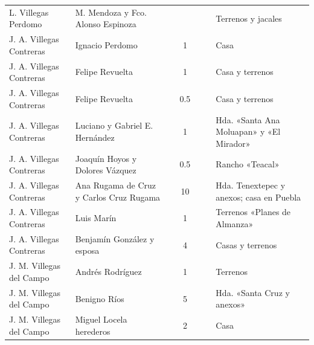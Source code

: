 \documentclass[14pt,twoside,final]{extbook} %
\begin{document}
{\begin{longtable}[c]{@{}p{2.5cm}lrSrrl@{}}
L. Villegas Perdomo & M. Mendoza y Fco. Alonso Espinoza &  & {} & {} & {} & Terrenos y jacales \\
J. A. Villegas Contreras & Ignacio Perdomo &  & 1 &  &  & Casa \\
J. A. Villegas Contreras & Felipe Revuelta &  & 1 &  &  & Casa y terrenos \\
J. A. Villegas Contreras & Felipe Revuelta &  & 0.5 &  &  & Casa y terrenos \\
J. A. Villegas Contreras & Luciano y Gabriel E. Hernández &  & 1 &  &  & Hda. «Santa Ana Moluapan» y «El Mirador» \\
J. A. Villegas Contreras & Joaquín Hoyos y Dolores Vázquez &  & 0.5 & {} & {} & Rancho «Teacal» \\
J. A. Villegas Contreras & Ana Rugama de Cruz y Carlos Cruz Rugama &  & 10 &  &  & Hda. Tenextepec y anexos; casa en Puebla \\
J. A. Villegas Contreras & Luis Marín &  & 1 &  &  & Terrenos «Planes de Almanza» \\
J. A. Villegas Contreras & Benjamín González y esposa &  & 4 &  &  & Casas y terrenos \\
J. M. Villegas del Campo & Andrés Rodríguez &  & 1 &  &  & Terrenos \\
J. M. Villegas del Campo & Benigno Ríos &  & 5 &  &  & Hda. «Santa Cruz y anexos» \\
J. M. Villegas del Campo & Miguel Locela herederos &  & 2 &  &  & Casa \\

\end{longtable}}
\end{document}
